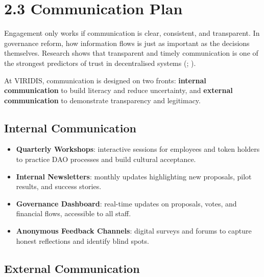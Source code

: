 \documentclass[
  english,
  12pt,
  oneside,
  open=any]{scrbook}
\providecommand{\tightlist}{%
  \setlength{\itemsep}{0pt}\setlength{\parskip}{0pt}}\usepackage{longtable,booktabs,array}
\begin{document}
\section{2.3 Communication Plan}\label{sec-communication}

Engagement only works if communication is clear, consistent, and
transparent. In governance reform, how information flows is just as
important as the decisions themselves. Research shows that transparent
and timely communication is one of the strongest predictors of trust in
decentralised systems
(;
).

At VIRIDIS, communication is designed on two fronts: \textbf{internal
communication} to build literacy and reduce uncertainty, and
\textbf{external communication} to demonstrate transparency and
legitimacy.

\subsection{Internal Communication}\label{internal-communication}

\begin{itemize}
\tightlist
\item
  \textbf{Quarterly Workshops}: interactive sessions for employees and
  token holders to practice DAO processes and build cultural
  acceptance.\\
\item
  \textbf{Internal Newsletters}: monthly updates highlighting new
  proposals, pilot results, and success stories.\\
\item
  \textbf{Governance Dashboard}: real-time updates on proposals, votes,
  and financial flows, accessible to all staff.\\
\item
  \textbf{Anonymous Feedback Channels}: digital surveys and forums to
  capture honest reflections and identify blind spots.
\end{itemize}

\subsection{External Communication}\label{external-communication}
\end{document}
